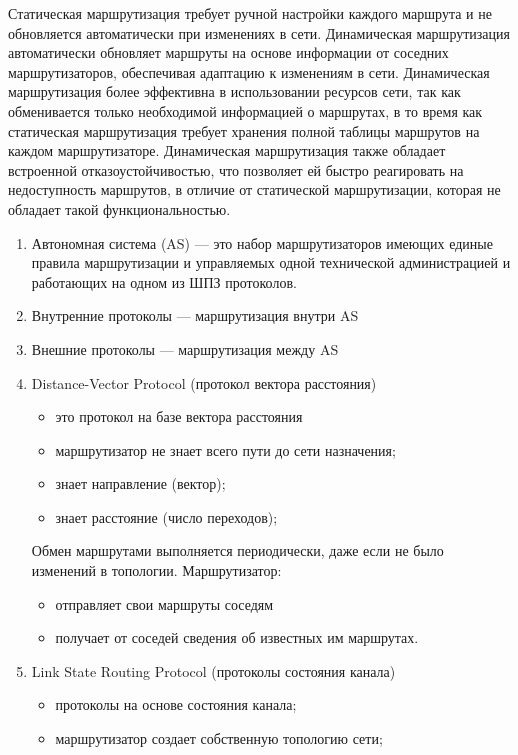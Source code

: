 Статическая маршрутизация требует ручной настройки каждого маршрута
и не обновляется автоматически при изменениях в сети.
Динамическая маршрутизация автоматически обновляет маршруты
на основе информации от соседних маршрутизаторов,
обеспечивая адаптацию к изменениям в сети.
Динамическая маршрутизация более эффективна в использовании ресурсов сети,
так как обменивается только необходимой информацией о маршрутах,
в то время как статическая маршрутизация требует хранения полной таблицы
маршрутов на каждом маршрутизаторе. Динамическая маршрутизация также обладает
встроенной отказоустойчивостью,
что позволяет ей быстро реагировать на недоступность маршрутов,
в отличие от статической маршрутизации,
которая не обладает такой функциональностью.

\begin{enumerate}
    \item Автономная система (AS) --- это набор маршрутизаторов имеющих
    единые правила маршрутизации и управляемых одной технической
    администрацией и работающих на одном из ШПЗ протоколов.
    \item Внутренние протоколы --- маршрутизация внутри AS
    \item Внешние протоколы --- маршрутизация между AS
    \item Distance-Vector Protocol (протокол вектора расстояния)
    \begin{itemize}
        \item это протокол на базе вектора расстояния
        \item маршрутизатор не знает всего пути до сети назначения;
        \item знает направление (вектор);
        \item знает расстояние (число переходов);
    \end{itemize}
    Обмен маршрутами выполняется периодически,
    даже если не было изменений в топологии. Маршрутизатор:
    \begin{itemize}
        \item отправляет свои маршруты соседям
        \item получает от соседей сведения об известных им маршрутах.
    \end{itemize}
    \item Link State Routing Protocol (протоколы состояния канала)
    \begin{itemize}
        \item протоколы на основе состояния канала;
        \item маршрутизатор создает собственную топологию сети;

\end{itemize}
\end{enumerate}

